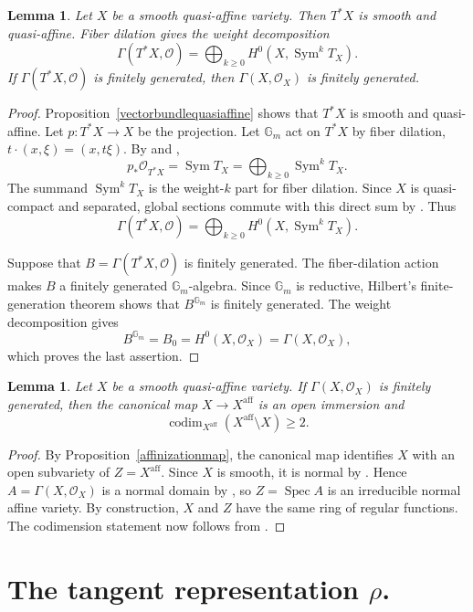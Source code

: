 \documentclass[10pt,a4paper]{amsart}
\newtheorem{lemma}[theorem]{Lemma}
\DeclareMathOperator{\Spec}{Spec}
\DeclareMathOperator{\Sym}{Sym}
\newcommand{\Gm}{\mathbb G_m}
\newcommand{\OO}{\mathcal O}
\newcommand{\aff}{\mathrm{aff}}
\begin{document}
\begin{lemma}\label{cotangentgrading}
    Let $X$ be a smooth quasi-affine variety. Then $T^*X$ is smooth and quasi-affine. Fiber dilation gives the weight decomposition
    \[
        \Gamma(T^*X,\OO)
        =\bigoplus_{k\ge0}H^0(X,\Sym^kT_X).
    \]
    If $\Gamma(T^*X,\OO)$ is finitely generated, then $\Gamma(X,\OO_X)$ is finitely generated.
\end{lemma}
\begin{proof}
    Proposition~\ref{vectorbundlequasiaffine} shows that $T^*X$ is smooth and quasi-affine. Let $p:T^*X\to X$ be the projection. Let $\Gm$ act on $T^*X$ by fiber dilation,
    $t\cdot(x,\xi)=(x,t\xi)$. By \cite[Definition~27.6.1]{Stacks} and \cite[Lemma~27.4.6]{Stacks},
    \[
        p_*\OO_{T^*X}=\Sym T_X=\bigoplus_{k\ge0}\Sym^kT_X.
    \]
    The summand $\Sym^kT_X$ is the weight-$k$ part for fiber dilation. Since $X$ is quasi-compact and separated, global sections commute with this direct sum by \cite[Lemma~30.6.1]{Stacks}. Thus
    \[
        \Gamma(T^*X,\OO)
        =\bigoplus_{k\ge0}H^0(X,\Sym^kT_X).
    \]

    Suppose that $B=\Gamma(T^*X,\OO)$ is finitely generated. The fiber-dilation action makes $B$ a finitely generated $\Gm$-algebra. Since $\Gm$ is reductive, Hilbert's finite-generation theorem shows that $B^{\Gm}$ is finitely generated. The weight decomposition gives
    \[
        B^{\Gm}=B_0=H^0(X,\OO_X)=\Gamma(X,\OO_X),
    \]
    which proves the last assertion.
\end{proof}

\begin{lemma}\label{smallboundary}
    Let $X$ be a smooth quasi-affine variety. If $\Gamma(X,\OO_X)$ is finitely generated, then the canonical map $X\to X^\aff$ is an open immersion and
    \[
        \operatorname{codim}_{X^\aff}(X^\aff\setminus X)\ge2.
    \]
\end{lemma}
\begin{proof}
    By Proposition~\ref{affinizationmap}, the canonical map identifies $X$ with an open subvariety of $Z=X^\aff$. Since $X$ is smooth, it is normal by \cite[Lemma~33.25.4]{Stacks}. Hence $A=\Gamma(X,\OO_X)$ is a normal domain by \cite[Lemma~28.7.9]{Stacks}, so $Z=\Spec A$ is an irreducible normal affine variety. By construction, $X$ and $Z$ have the same ring of regular functions. The codimension statement now follows from \cite[Theorem~4.2]{Grosshans}.
\end{proof}

\section{The tangent representation $\rho$.}\label{tangentsection}
\end{document}
